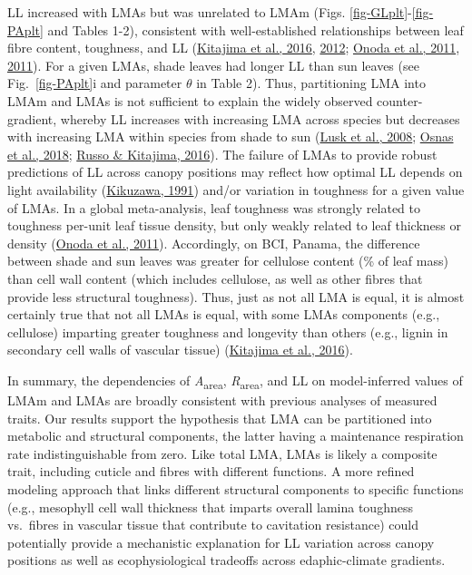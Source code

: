 \documentclass[
  12pt,
  a4paper,
,tablecaptionabove
]{scrartcl}
\begin{document}
LL increased with LMAs but was unrelated to LMAm (Figs.
\ref{fig-GLplt}-\ref{fig-PAplt} and Tables 1-2), consistent with
well-established relationships between leaf fibre content, toughness,
and LL (\protect\hyperlink{ref-Kitajima2016}{Kitajima et al., 2016},
\protect\hyperlink{ref-Kitajima2012}{2012};
\protect\hyperlink{ref-Onoda2011}{Onoda et al., 2011},
\protect\hyperlink{ref-Onoda2011}{2011}). For a given LMAs, shade leaves
had longer LL than sun leaves (see Fig.~\ref{fig-PAplt}i and parameter
\(\theta\) in Table 2). Thus, partitioning LMA into LMAm and LMAs is not
sufficient to explain the widely observed counter-gradient, whereby LL
increases with increasing LMA across species but decreases with
increasing LMA within species from shade to sun
(\protect\hyperlink{ref-Lusk2008}{Lusk et al., 2008};
\protect\hyperlink{ref-Osnas2018}{Osnas et al., 2018};
\protect\hyperlink{ref-Russo2016}{Russo \& Kitajima, 2016}). The failure
of LMAs to provide robust predictions of LL across canopy positions may
reflect how optimal LL depends on light availability
(\protect\hyperlink{ref-Kikuzawa1991}{Kikuzawa, 1991}) and/or variation
in toughness for a given value of LMAs. In a global meta-analysis, leaf
toughness was strongly related to toughness per-unit leaf tissue
density, but only weakly related to leaf thickness or density
(\protect\hyperlink{ref-Onoda2011}{Onoda et al., 2011}). Accordingly, on
BCI, Panama, the difference between shade and sun leaves was greater for
cellulose content (\% of leaf mass) than cell wall content (which
includes cellulose, as well as other fibres that provide less structural
toughness). Thus, just as not all LMA is equal, it is almost certainly
true that not all LMAs is equal, with some LMAs components (e.g.,
cellulose) imparting greater toughness and longevity than others (e.g.,
lignin in secondary cell walls of vascular tissue)
(\protect\hyperlink{ref-Kitajima2016}{Kitajima et al., 2016}).

In summary, the dependencies of \emph{A}\textsubscript{area},
\emph{R}\textsubscript{area}, and LL on model-inferred values of LMAm
and LMAs are broadly consistent with previous analyses of measured
traits. Our results support the hypothesis that LMA can be partitioned
into metabolic and structural components, the latter having a
maintenance respiration rate indistinguishable from zero. Like total
LMA, LMAs is likely a composite trait, including cuticle and fibres with
different functions. A more refined modeling approach that links
different structural components to specific functions (e.g., mesophyll
cell wall thickness that imparts overall lamina toughness vs.~fibres in
vascular tissue that contribute to cavitation resistance) could
potentially provide a mechanistic explanation for LL variation across
canopy positions as well as ecophysiological tradeoffs across
edaphic-climate gradients.
\end{document}

